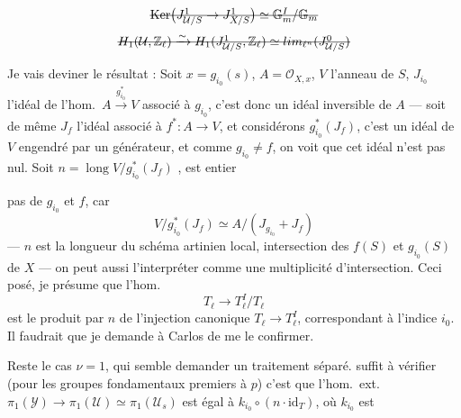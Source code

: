 \documentclass[11pt,a4paper]{article}
\begin{document}

\struck{[On va faire des calculs intrinsèques, \uncertain{avec}}
\[
\text{\struck{$\operatorname{Ker}\bigl(J^{1}_{\mathcal{U}/S} \to J^{1}_{X/S}\bigr) \simeq \mathbb{G}_m^{I} / \mathbb{G}_m$}}
\]
\[
\text{\struck{$H_1(\mathcal{U}, \mathbb{Z}_\ell) \xrightarrow{\sim} H_1(J^{1}_{\mathcal{U}/S}, \mathbb{Z}_\ell) \simeq \varprojlim {}_{\ell^n}(J^{0}_{\mathcal{U}/S})$}}
\]

Je vais deviner le résultat : Soit \struck{\ill{}} $x = g_{i_0}(s)$, $A = \mathcal{O}_{X,x}$, $V$ l'anneau de $S$, $J_{i_0}$ l'idéal de l'hom.\ $A \xrightarrow{g_{i_0}^{*}} V$ associé à $g_{i_0}$, c'est donc un idéal inversible de $A$ --- soit de même $J_f$ l'idéal associé à $f^{*} : A \to V$, et considérons $g_{i_0}^{*}(J_f)$, c'est un idéal de $V$ engendré par un générateur, et comme $g_{i_0} \neq f$, on voit que cet idéal n'est pas nul. Soit $n = \operatorname{long} V / g_{i_0}^{*}(J_f)$ \struck{$=$}, est entier

  pas     de $g_{i_0}$ et $f$, car
\[
V / g_{i_0}^{*}(J_f) \simeq A / (J_{g_{i_0}} + J_f)
\]
---  $n$ est la longueur du schéma artinien local, intersection des  $f(S)$ et $g_{i_0}(S)$ de $X$ --- on peut aussi l'interpréter comme une multiplicité d'intersection. Ceci posé, je présume que l'hom.
\[
T_\ell \longrightarrow T_\ell^{I} / T_\ell
\]
est le produit par $n$ de l'injection canonique $T_\ell \to T_\ell^{I}$, correspondant à l'indice $i_0$. Il faudrait que je demande à Carlos de me le confirmer.

Reste le cas $\nu = 1$, qui semble demander un traitement séparé.   suffit à vérifier (pour les groupes fondamentaux premiers à $p$) c'est que l'hom.\ ext.\ $\pi_1(\mathcal{Y}) \to \pi_1(\mathcal{U}) \simeq \pi_1(\mathcal{U}_s)$ est égal à \struck{\ill{}} $k_{i_0} \circ (n \cdot \mathrm{id}_T)$, où $k_{i_0}$ est

\end{document}
